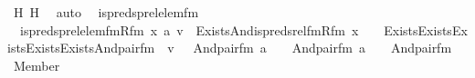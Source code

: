 \begin{isabellebody}
\ H{}\ H{}\ \isamarkupfalse%
\ auto\ \isanewline
{}\isamarkupfalse%
%
\endisatagproof
{\isafoldproof}%
%
\isadelimproof
\isanewline
%
\endisadelimproof
\isanewline
{}\isamarkupfalse%
\isanewline
\isanewline
{}\isamarkupfalse%
\ is{\isacharunderscore}{\kern0pt}preds{\isacharunderscore}{\kern0pt}prel{\isacharunderscore}{\kern0pt}elem{\isacharunderscore}{\kern0pt}fm\ \ \isanewline
\ \ {\isachardoublequoteopen}is{\isacharunderscore}{\kern0pt}preds{\isacharunderscore}{\kern0pt}prel{\isacharunderscore}{\kern0pt}elem{\isacharunderscore}{\kern0pt}fm{\isacharparenleft}{\kern0pt}Rfm{\isacharcomma}{\kern0pt}\ x{\isacharcomma}{\kern0pt}\ a{\isacharcomma}{\kern0pt}\ v{\isacharparenright}{\kern0pt}\ {\isasymequiv}\ Exists{\isacharparenleft}{\kern0pt}And{\isacharparenleft}{\kern0pt}is{\isacharunderscore}{\kern0pt}preds{\isacharunderscore}{\kern0pt}rel{\isacharunderscore}{\kern0pt}fm{\isacharparenleft}{\kern0pt}Rfm{\isacharcomma}{\kern0pt}\ x\ {\isacharhash}{\kern0pt}{\isacharplus}{\kern0pt}\ {}{\isacharcomma}{\kern0pt}\ {}{\isacharparenright}{\kern0pt}{\isacharcomma}{\kern0pt}\ Exists{\isacharparenleft}{\kern0pt}Exists{\isacharparenleft}{\kern0pt}Exists{\isacharparenleft}{\kern0pt}Exists{\isacharparenleft}{\kern0pt}Exists{\isacharparenleft}{\kern0pt}And{\isacharparenleft}{\kern0pt}pair{\isacharunderscore}{\kern0pt}fm{\isacharparenleft}{\kern0pt}{}{\isacharcomma}{\kern0pt}\ {}{\isacharcomma}{\kern0pt}\ v\ {\isacharhash}{\kern0pt}{\isacharplus}{\kern0pt}\ {}{\isacharparenright}{\kern0pt}{\isacharcomma}{\kern0pt}\ And{\isacharparenleft}{\kern0pt}pair{\isacharunderscore}{\kern0pt}fm{\isacharparenleft}{\kern0pt}{}{\isacharcomma}{\kern0pt}\ a\ {\isacharhash}{\kern0pt}{\isacharplus}{\kern0pt}\ {}{\isacharcomma}{\kern0pt}\ {}{\isacharparenright}{\kern0pt}{\isacharcomma}{\kern0pt}\ And{\isacharparenleft}{\kern0pt}pair{\isacharunderscore}{\kern0pt}fm{\isacharparenleft}{\kern0pt}{}{\isacharcomma}{\kern0pt}\ a\ {\isacharhash}{\kern0pt}{\isacharplus}{\kern0pt}\ {}{\isacharcomma}{\kern0pt}\ {}{\isacharparenright}{\kern0pt}{\isacharcomma}{\kern0pt}\ And{\isacharparenleft}{\kern0pt}pair{\isacharunderscore}{\kern0pt}fm{\isacharparenleft}{\kern0pt}{}{\isacharcomma}{\kern0pt}\ {}{\isacharcomma}{\kern0pt}\ {}{\isacharparenright}{\kern0pt}{\isacharcomma}{\kern0pt}\ Member{\isacharparenleft}{\kern0pt}{}{\isacharcomma}{\kern0pt}\ {}{\isacharparenright}{\kern0pt}{\isacharparenright}{\kern0pt}{\isacharparenright}{\kern0pt}{\isacharparenright}{\kern0pt}{\isacharparenright}{\kern0pt}{\isacharparenright}{\kern0pt}{\isacharparenright}{\kern0pt}{\isacharparenright}{\kern0pt}{\isacharparenright}{\kern0pt}{\isacharparenright}{\kern0pt}{\isacharparenright}{\kern0pt}{\isacharparenright}{\kern0pt}{\isachardoublequoteclose}\ \isanewline

\end{isabellebody}
